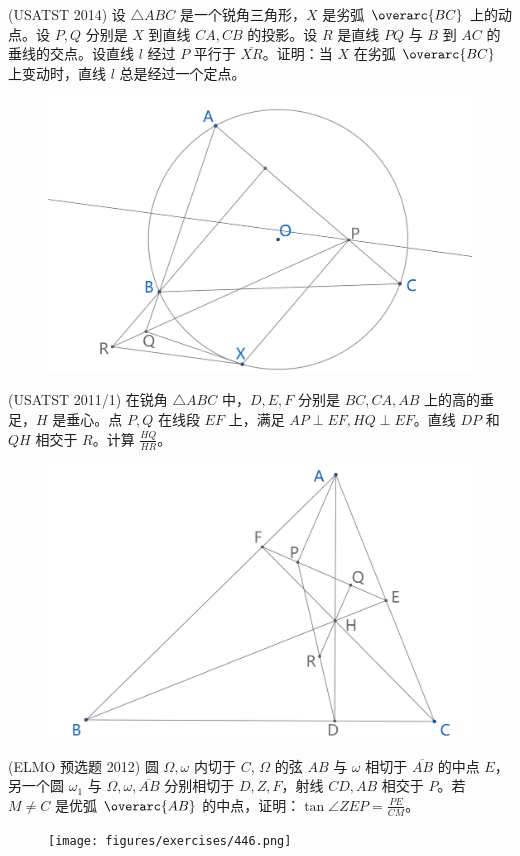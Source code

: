 \begin{exercise}
    (USATST 2014) 设 $\triangle ABC$ 是一个锐角三角形，$X$ 是劣弧 $\overarc{BC}$ 上的动点。设 $P, Q$ 分别是 $X$ 到直线 $CA, CB$ 的投影。设 $R$ 是直线 $PQ$ 与 $B$ 到 $AC$ 的垂线的交点。设直线 $l$ 经过 $P$ 平行于 $\overline{XR}$。证明：当 $X$ 在劣弧 $\overarc{BC}$ 上变动时，直线 $l$ 总是经过一个定点。
\end{exercise}
\begin{figure}[H]
    \centering
    \includegraphics[width=0.7\linewidth]{figures/exercises/444.png}
\end{figure}


\newpage 
\begin{exercise}
    (USATST 2011/1) 在锐角 $\triangle ABC$ 中，$D, E, F$ 分别是 $BC, CA, AB$ 上的高的垂足，$H$ 是垂心。点 $P, Q$ 在线段 $EF$ 上，满足 $AP \perp EF, HQ \perp EF$。直线 $DP$ 和 $QH$ 相交于 $R$。计算 $\frac{HQ}{HR}$。
\end{exercise}
\begin{figure}[H]
    \centering
    \includegraphics[width=0.7\linewidth]{figures/exercises/445.png}
\end{figure}

\begin{exercise}
    (ELMO 预选题 2012) 圆 $\Omega, \omega$ 内切于 $C$, $\Omega$ 的弦 $AB$ 与 $\omega$ 相切于 $\overline{AB}$ 的中点 $E$，另一个圆 $\omega_1$ 与 $\Omega, \omega, \overline{AB}$ 分别相切于 $D, Z, F$，射线 $CD, AB$ 相交于 $P$。若 $M \neq C$ 是优弧 $\overarc{AB}$ 的中点，证明：$\tan \angle ZEP = \frac{PE}{CM}$。
\end{exercise}
\begin{figure}[H]
    \centering
    \texttt{[image: figures/exercises/446.png]}
\end{figure}


